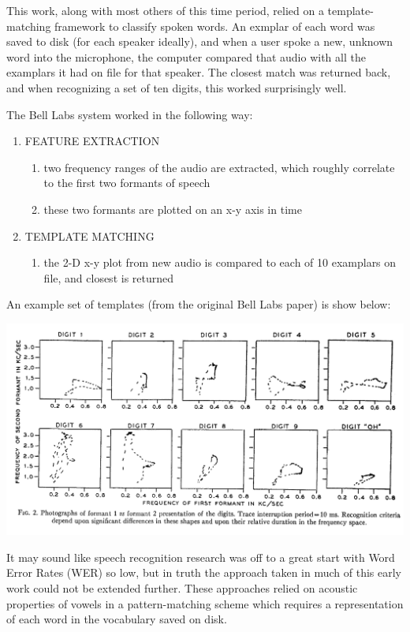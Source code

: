 \documentclass[10pt,a4paper]{article}
\begin{document}
This work, along with most others of this time period, relied on a template-matching framework to classify spoken words. An exmplar of each word was saved to disk (for each speaker ideally), and when a user spoke a new, unknown word into the microphone, the computer compared that audio with all the examplars it had on file for that speaker. The closest match was returned back, and when recognizing a set of ten digits, this worked surprisingly well. 

The Bell Labs system worked in the following way:

\begin{enumerate}
\item FEATURE EXTRACTION
  \begin{enumerate}
  \item two frequency ranges of the audio are extracted, which roughly correlate to the first two formants of speech
  \item these two formants are plotted on an x-y axis in time
  \end{enumerate}
  
\item TEMPLATE MATCHING
  \begin{enumerate}
  \item the 2-D x-y plot from new audio is compared to each of 10 examplars on file, and closest is returned
  \end{enumerate}
\end{enumerate}


An example set of templates (from the original Bell Labs paper) is show below:


\begin{center}
\includegraphics[width=.9\textwidth,keepaspectratio]{figs/digits.png}
\end{center}


It may sound like speech recognition research was off to a great start with Word Error Rates (WER) so low, but in truth the approach taken in much of this early work could not be extended further. These approaches relied on acoustic properties of vowels in a pattern-matching scheme which requires a representation of each word in the vocabulary saved on disk.
\end{document}
